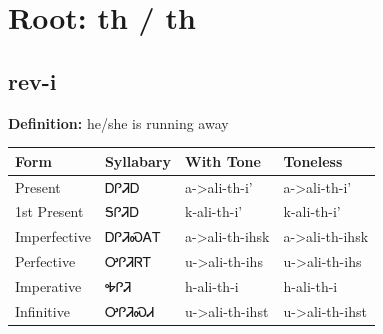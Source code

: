 \documentclass{article}%
\begin{document}
%
\normalsize%
\section*{Root: th / th}%
\subsection*{rev-i}%
\textbf{Definition: }%
he/she is running away%
\\[0.5em]%
\begin{tabular}{|l|l|l|l|}%
\hline%
\textbf{Form}&\textbf{Syllabary}&\textbf{With Tone}&\textbf{Toneless}\\%
\hline%
Present&ᎠᎵᏘᎠ&a{-}>ali{-}th{-}i'&a{-}>ali{-}th{-}i'\\%
1st Present&ᎦᎵᏘᎠ&k{-}ali{-}th{-}i'&k{-}ali{-}th{-}i'\\%
Imperfective&ᎠᎵᏘᏍᎪᎢ&a{-}>ali{-}th{-}ihsk&a{-}>ali{-}th{-}ihsk\\%
Perfective&ᎤᎵᏘᏒᎢ&u{-}>ali{-}th{-}ihs&u{-}>ali{-}th{-}ihs\\%
Imperative&ᎭᎵᏘ&h{-}ali{-}th{-}i&h{-}ali{-}th{-}i\\%
Infinitive&ᎤᎵᏘᏍᏗ&u{-}>ali{-}th{-}ihst&u{-}>ali{-}th{-}ihst\\%
\hline%
\end{tabular}%
\\[1em]%
\end{document}
